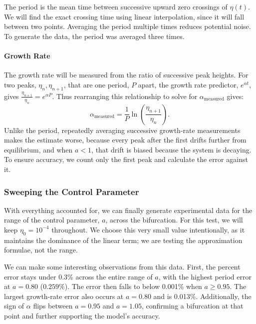     The period is the mean time between successive upward zero crossings of $\eta(t)$. We will find the exact crossing time using linear interpolation, since it will fall between two points. Averaging the period multiple times reduces potential noise. To generate the data, the period was averaged three times.

    \paragraph{Growth Rate}

    The growth rate will be measured from the ratio of successive peak heights. For two peaks, $\eta_n,\eta_{n+1}$, that are one period, $P$ apart, the growth rate predictor, $e^{\alpha t}$, gives $\frac{\eta_{n+1}}{\eta_n}=e^{\alpha P}$. Thus rearranging this relationship to solve for $\alpha_{\text{measured}}$ gives:
    \[
        \alpha_{\text{measured}}=\frac{1}{P}\ln\left(\frac{\eta_{n+1}}{\eta_n}\right).
    \]
    Unlike the period, repeatedly averaging successive growth-rate measurements makes the estimate worse, because every peak after the first drifts further from equilibrium, and when $a<1$, that drift is biased because the system is decaying. To ensure accuracy, we count only the first peak and calculate the error against it.

    \subsubsection{Sweeping the Control Parameter}\label{subsubsec:sweeping-control-parameter}

    With everything accounted for, we can finally generate experimental data for the range of the control parameter, $a$, across the bifurcation. For this test, we will keep $\eta_0=10^{-4}$ throughout. We choose this very small value intentionally, as it maintains the dominance of the linear term; we are testing the approximation formulae, not the range.

    \begin{table}[H]
        \centering
        \footnotesize
       	
        \caption{Predicted vs. Measured Period and Growth Rate Across the Control Parameter $a$}
        \label{tab:sweep}
    \end{table}

    We can make some interesting observations from this data. First, the percent error stays under 0.3\% across the entire range of $a$, with the highest period error at $a=0.80$ ($0.259$\%). The error then falls to below 0.001\% when $a\geq0.95$. The largest growth-rate error also occurs at $a=0.80$ and is 0.013\%. Additionally, the sign of $\alpha$ flips between $a=0.95$ and $a=1.05$, confirming a bifurcation at that point and further supporting the model's accuracy.


